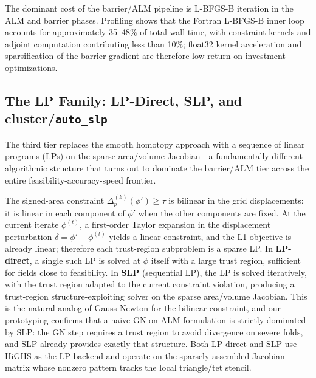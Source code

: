 The dominant cost of the barrier/ALM pipeline is L-BFGS-B iteration in the ALM and barrier phases. Profiling shows that the Fortran L-BFGS-B inner loop accounts for approximately 35--48\% of total wall-time, with constraint kernels and adjoint computation contributing less than 10\%; float32 kernel acceleration and sparsification of the barrier gradient are therefore low-return-on-investment optimizations.

\subsection{The LP Family: LP-Direct, SLP, and cluster/\texttt{auto\_slp}}
\label{sec:lp_family}

The third tier replaces the smooth homotopy approach with a sequence of linear programs (LPs) on the sparse area/volume Jacobian—a fundamentally different algorithmic structure that turns out to dominate the barrier/ALM tier across the entire feasibility-accuracy-speed frontier.

The signed-area constraint $\Delta^{(k)}_p(\phi') \geq \tau$ is bilinear in the grid displacements: it is linear in each component of $\phi'$ when the other components are fixed. At the current iterate $\phi^{(t)}$, a first-order Taylor expansion in the displacement perturbation $\delta = \phi' - \phi^{(t)}$ yields a linear constraint, and the L1 objective is already linear; therefore each trust-region subproblem is a sparse LP. In \textbf{LP-direct}, a single such LP is solved at $\phi$ itself with a large trust region, sufficient for fields close to feasibility. In \textbf{SLP} (sequential LP), the LP is solved iteratively, with the trust region adapted to the current constraint violation, producing a trust-region structure-exploiting solver on the sparse area/volume Jacobian. This is the natural analog of Gauss-Newton for the bilinear constraint, and our prototyping confirms that a naive GN-on-ALM formulation is strictly dominated by SLP: the GN step requires a trust region to avoid divergence on severe folds, and SLP already provides exactly that structure. Both LP-direct and SLP use HiGHS as the LP backend and operate on the sparsely assembled Jacobian matrix whose nonzero pattern tracks the local triangle/tet stencil.

